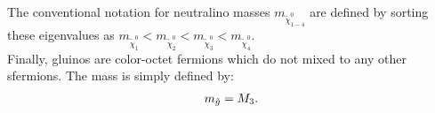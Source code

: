 The conventional notation for neutralino masses $m_{\tilde{\chi}_{1-4}^0}$ 
are defined by sorting these eigenvalues as $m_{\tilde{\chi}_{1}^0}<m_{\tilde{\chi}_{2}^0}<m_{\tilde{\chi}_{3}^0}<m_{\tilde{\chi}_{4}^0}$. \\

\noindent Finally, gluinos are color-octet fermions which do not mixed to any other sfermions. The mass is simply defined by:
\begin{align}
m_{\tilde{g}} = M_3. \label{eq::gluinoMass}
\end{align}



